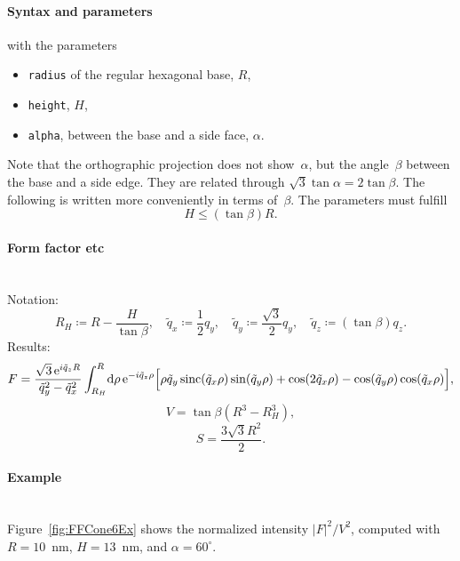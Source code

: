\FloatBarrier
\paragraph{Syntax and parameters}
\begin{quote}
\end{quote}
with the parameters
\begin{itemize}
\item \texttt{radius} of the regular hexagonal base, $R$,
\item \texttt{height}, $H$,
\item \texttt{alpha}, between the base and a side face, $\alpha$.
\end{itemize}
Note that the orthographic projection does not show~$\alpha$,
but the angle~$\beta$ between the base and a side edge.
They are related through $\sqrt{3}\tan \alpha = 2 \tan \beta$.
The following is written more conveniently in terms of~$\beta$.
The parameters must fulfill
\begin{displaymath}
  H \le (\tan\beta)R.
\end{displaymath}

\paragraph{Form factor etc}\strut\\
Notation:
\begin{equation*}
  R_H \coloneqq R-\frac{H}{\tan\beta},\quad
  \tilde{q}_x \coloneqq \frac{1}{2}q_y,\quad
  \tilde{q}_y \coloneqq \frac{\sqrt{3}}{2}q_y,\quad
  \tilde{q}_z \coloneqq (\tan\beta) q_z.
\end{equation*}
Results:
\begin{equation*}
  F = \frac{\sqrt{3}\, \text{e}^{i\tilde q_z R}}{\tilde q_y ^2 - \tilde q_x^2}
    \int_{R_H}^R\!\text{d}\rho\, \text{e}^{-i\tilde q_z \rho}
\Big[\rho\tilde q_y \operatorname{sinc}(\tilde q_x\rho)\sin(\tilde q_y\rho)
+\cos(2\tilde q_x\rho)-\cos(\tilde q_y \rho)\cos(\tilde q_x\rho) \Big],
\end{equation*}
\begin{equation*}
  V = \tan\beta  \left( R^3- R_H^3 \right),
\end{equation*}
\begin{equation*}
  S =\dfrac{3\sqrt{3}R^2}{2}.
\end{equation*}

\paragraph{Example}\strut\\
Figure~\ref{fig:FFCone6Ex} shows the normalized intensity
$|F|^2/V^2$, computed with $R=10$~nm, $H=13$~nm, and
$\alpha=60^{\circ}$.


